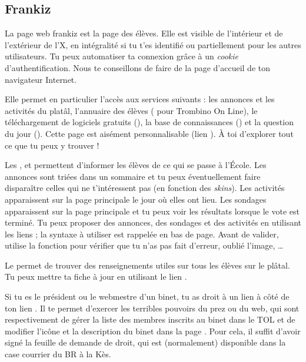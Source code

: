 \subsection{Frankiz}
\label{frankiz} La page web frankiz est la page des \'el\`eves. Elle est visible de l'int\'erieur et de
l'ext\'erieur de l'X, en int\'egralit\'e si tu t'es identifi\'e ou partiellement pour les autres
utilisateurs. Tu peux automatiser ta connexion gr\^ace \`a  un \emph{cookie} d'authentification. Nous te
conseillons de faire de  la page d'accueil de ton navigateur Internet.

Elle permet en particulier l'acc\`es aux services suivants : les
annonces et les activit\'es du plat\^al, l'annuaire des \'el\`eves
( pour Trombino On Line), le t\'el\'echargement de logiciels
gratuits (), la base de connaissances () et
la question du jour (). Cette page est
ais\'ement personnalisable (lien ). \`A toi d'explorer
tout ce que tu peux y trouver !

Les ,  et  permettent d'informer les \'el\`eves de ce qui se passe \`a  l'\'Ecole. Les annonces sont tri\'ees dans
un sommaire et tu peux \'eventuellement faire dispara\^itre celles qui ne t'int\'eressent pas (en fonction des \emph{skins}). Les activit\'es apparaissent
sur la page principale le jour o\`u elles ont lieu. Les sondages apparaissent sur la page principale et tu peux voir les
r\'esultats lorsque le vote est termin\'e. Tu peux proposer des annonces, des sondages et des activit\'es en utilisant les liens ; la syntaxe \`a  utiliser est
rappel\'ee en bas de page. Avant de valider, utilise la fonction  pour v\'erifier que tu n'as pas fait d'erreur, oubli\'e l'image, \dots

Le  permet de trouver des renseignements utiles sur
tous les \'el\`eves sur le pl\^atal. Tu peux mettre ta fiche \`a  jour en
utilisant le lien .

Si tu es le pr\'esident ou le webmestre d'un binet, tu as droit \`a  un
lien  \`a  c\^ot\'e de ton lien .
Il te permet d'exercer les terribles pouvoirs du prez ou du web, qui
sont respectivement de g\'erer la liste des membres inscrits au binet
dans le TOL et de modifier l'ic\^one et la description du binet dans
la page . Pour cela, il suffit d'avoir sign\'e la feuille
de demande de droit, qui est (normalement) disponible dans la case
courrier du BR \`a  la K\`es.

